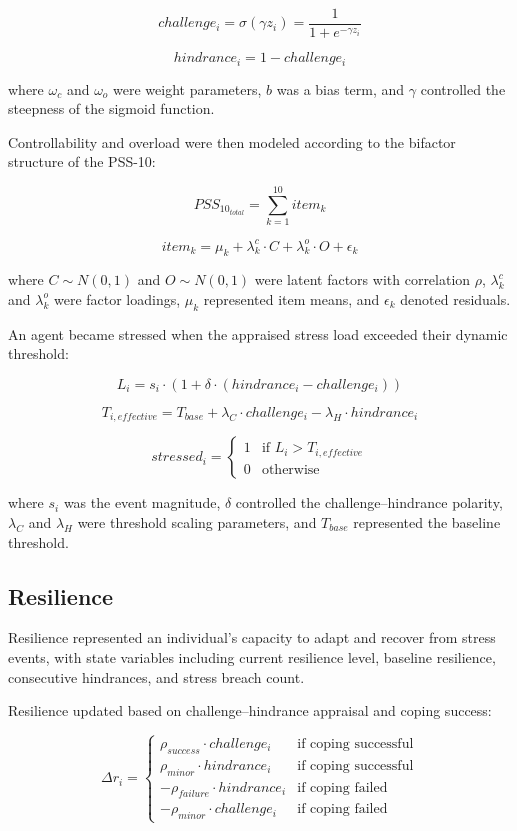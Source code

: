 \documentclass[
  letterpaper,
  DIV=11,
  numbers=noendperiod]{scrartcl}
\begin{document}
\[challenge_i = \sigma(\gamma z_i) = \frac{1}{1 + e^{-\gamma z_i}}\]

\[hindrance_i = 1 - challenge_i\]

where \(\omega_c\) and \(\omega_o\) were weight parameters, \(b\) was a
bias term, and \(\gamma\) controlled the steepness of the sigmoid
function.

Controllability and overload were then modeled according to the bifactor
structure of the PSS-10:

\[PSS_{10_{total}} = \sum_{k=1}^{10} item_k\]

\[item_k = \mu_k + \lambda_k^c \cdot C + \lambda_k^o \cdot O + \epsilon_k\]

where \(C \sim N(0,1)\) and \(O \sim N(0,1)\) were latent factors with
correlation \(\rho\), \(\lambda_k^c\) and \(\lambda_k^o\) were factor
loadings, \(\mu_k\) represented item means, and \(\epsilon_k\) denoted
residuals.

An agent became stressed when the appraised stress load exceeded their
dynamic threshold:

\[L_i = s_i \cdot (1 + \delta \cdot (hindrance_i - challenge_i))\]

\[T_{i,effective} = T_{base} + \lambda_C \cdot challenge_i - \lambda_H \cdot hindrance_i\]

\[stressed_i = \begin{cases} 1 & \text{if } L_i > T_{i,effective} \\ 0 & \text{otherwise} \end{cases}\]

where \(s_i\) was the event magnitude, \(\delta\) controlled the
challenge--hindrance polarity, \(\lambda_C\) and \(\lambda_H\) were
threshold scaling parameters, and \(T_{base}\) represented the baseline
threshold.

\subsection{Resilience}\label{resilience}

Resilience represented an individual's capacity to adapt and recover
from stress events, with state variables including current resilience
level, baseline resilience, consecutive hindrances, and stress breach
count.

Resilience updated based on challenge--hindrance appraisal and coping
success:

\[\Delta r_i = \begin{cases}
\rho_{success} \cdot challenge_i & \text{if coping successful} \\
\rho_{minor} \cdot hindrance_i & \text{if coping successful} \\
-\rho_{failure} \cdot hindrance_i & \text{if coping failed} \\
-\rho_{minor} \cdot challenge_i & \text{if coping failed}
\end{cases}\]
\end{document}
